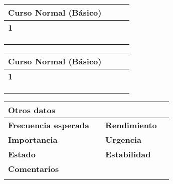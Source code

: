 \begin{table}[h]
\centering
\begin{tabular}{llll}
\hline
\multicolumn{1}{|l}{\textbf{Curso Normal (Básico)}} &  &                       & \multicolumn{1}{l|}{} \\ \hline
\multicolumn{1}{l|}{\textbf{1}}                     &  & \multicolumn{1}{l|}{} &                       \\
\multicolumn{1}{l|}{}                               &  & \multicolumn{1}{l|}{} &                       \\
\multicolumn{1}{l|}{}                               &  & \multicolumn{1}{l|}{} &                       \\
\multicolumn{1}{l|}{}                               &  & \multicolumn{1}{l|}{} &                      
\end{tabular}
\end{table}

\begin{table}[h]
\centering
\begin{tabular}{llll}
\hline
\multicolumn{1}{|l}{\textbf{Curso Normal (Básico)}} &  &                       & \multicolumn{1}{l|}{} \\ \hline
\multicolumn{1}{l|}{\textbf{1}}                     &  & \multicolumn{1}{l|}{} &                       \\
\multicolumn{1}{l|}{}                               &  & \multicolumn{1}{l|}{} &                       \\
\multicolumn{1}{l|}{}                               &  & \multicolumn{1}{l|}{} &                       \\
\multicolumn{1}{l|}{}                               &  & \multicolumn{1}{l|}{} &                      
\end{tabular}
\end{table}

\begin{table}[h]
\centering
\begin{tabular}{llll}
\textbf{Otros datos}         &  &                      &  \\ \hline
\textbf{Frecuencia esperada} &  & \textbf{Rendimiento} &  \\
\textbf{Importancia}         &  & \textbf{Urgencia}    &  \\
\textbf{Estado}              &  & \textbf{Estabilidad} &  \\
\textbf{Comentarios}         &  &                      &  \\
                             &  &                      & 
\end{tabular}
\end{table}
